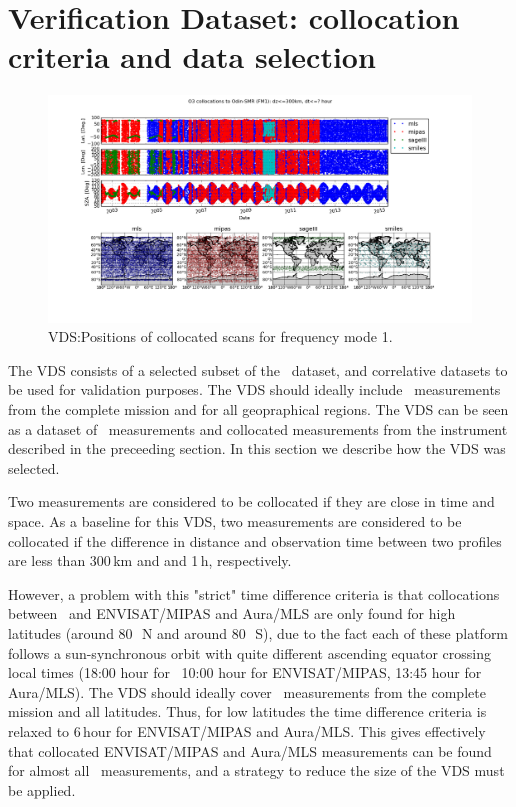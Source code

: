 \section{Verification Dataset: collocation criteria and data selection}
\label{sec:vdsselection}

\begin{figure}[t]
\centering
\includegraphics[width=17cm]{test_collocation_fm1.png}
\caption{VDS:Positions of collocated scans for frequency mode 1.}
\label{fig:vdsfm1}
\end{figure}


The VDS consists of a selected subset of the \smr\ dataset, and correlative
datasets to be used for validation purposes. 
The VDS should ideally include \smr\ measurements from    
the complete mission and for all geopraphical regions.
The VDS can be seen as a dataset of \smr\ measurements and
collocated measurements from the instrument described 
in the preceeding section. In this section we describe
how the VDS was selected.

 
Two measurements are considered to be collocated if they
are close in time and space. As a baseline for this VDS,
two measurements are considered to be collocated if the 
difference in distance and observation time between two profiles are 
less than 300\,km and and 1\,h, respectively.

However, a problem with this "strict" time difference criteria
is that collocations between \smr\ and  ENVISAT/MIPAS and Aura/MLS
are only found for high latitudes (around 80\,\degree\ N and around 80\,\degree\ S),
due to the fact each of these platform follows a sun-synchronous orbit
with quite different ascending equator crossing local times  
(18:00 hour for \smr\, 10:00 hour for ENVISAT/MIPAS,
 13:45 hour for Aura/MLS).
The VDS should ideally cover \smr\ measurements from    
the complete mission and all latitudes. 
Thus, for low latitudes the time difference criteria
is relaxed to 6\,hour for ENVISAT/MIPAS and Aura/MLS.
This gives effectively that collocated ENVISAT/MIPAS and Aura/MLS 
measurements can be found for almost all \smr\ measurements, and a strategy
to reduce the size of the VDS must be applied.


